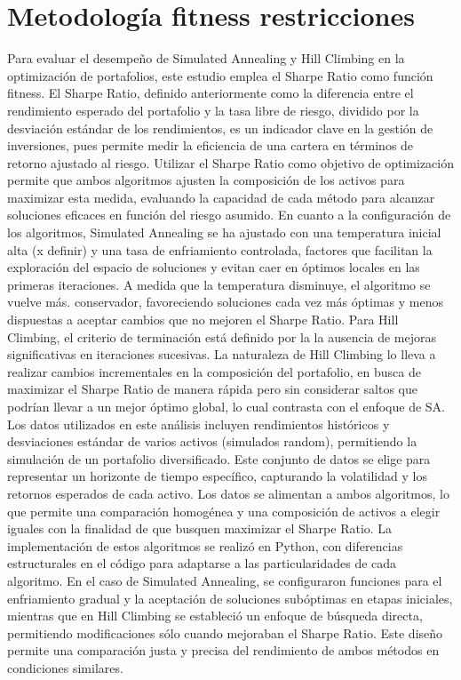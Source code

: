 \documentclass[9pt,a4paper,twoside]{rho-class/rho}
\begin{document}
    
    \section{Metodología fitness restricciones}
            
            Para evaluar el desempeño de Simulated Annealing y Hill Climbing en la optimización de portafolios, este estudio emplea el Sharpe Ratio como función fitness. El Sharpe Ratio, definido anteriormente como la diferencia entre el rendimiento esperado del portafolio y la tasa libre de riesgo, dividido por la desviación estándar de los rendimientos, es un indicador clave en la gestión de inversiones, pues permite medir la eficiencia de una cartera en términos de retorno ajustado al riesgo. Utilizar el Sharpe Ratio como objetivo de optimización permite que ambos algoritmos ajusten la composición de los activos para maximizar esta medida, evaluando la capacidad de cada método para alcanzar soluciones eficaces en función del riesgo asumido.
            En cuanto a la configuración de los algoritmos, Simulated Annealing se ha ajustado con una temperatura inicial alta (x definir) y una tasa de enfriamiento controlada, factores que facilitan la exploración del espacio de soluciones y evitan caer en óptimos locales en las primeras iteraciones. A medida que la temperatura disminuye, el algoritmo se vuelve más.
            conservador, favoreciendo soluciones cada vez más óptimas y menos dispuestas a aceptar cambios que no mejoren el Sharpe Ratio. Para Hill Climbing, el criterio de terminación está definido por la la ausencia de mejoras significativas en iteraciones sucesivas. La naturaleza de Hill Climbing lo lleva a realizar cambios incrementales en la composición del portafolio, en busca de maximizar el Sharpe Ratio de manera rápida pero sin considerar saltos que podrían llevar a un mejor óptimo global, lo cual contrasta con el enfoque de SA.
            Los datos utilizados en este análisis incluyen rendimientos históricos y desviaciones estándar de varios activos (simulados random), permitiendo la simulación de un portafolio diversificado. Este conjunto de datos se elige para representar un horizonte de tiempo específico, capturando la volatilidad y los retornos esperados de cada activo. Los datos se alimentan a ambos algoritmos, lo que permite una comparación homogénea y una composición de activos a elegir iguales con la finalidad de que busquen maximizar el Sharpe Ratio.            La implementación de estos algoritmos se realizó en Python, con diferencias estructurales en el código para adaptarse a las particularidades de cada algoritmo. En el caso de Simulated Annealing, se configuraron funciones para el enfriamiento gradual y la aceptación de soluciones subóptimas en etapas iniciales, mientras que en Hill Climbing se estableció un enfoque de búsqueda directa, permitiendo modificaciones sólo cuando mejoraban el Sharpe Ratio. Este diseño permite una comparación justa y precisa del rendimiento de ambos métodos en condiciones similares.
\end{document}
